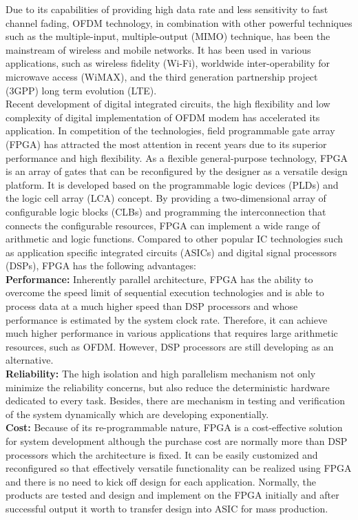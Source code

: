Due to its capabilities of providing high data rate and less sensitivity to fast channel fading, OFDM technology, in combination with other powerful techniques such as the multiple-input, multiple-output (MIMO) technique, has been the mainstream of wireless and mobile networks. It has been used in various applications, such as wireless fidelity (Wi-Fi), worldwide inter-operability for microwave access (WiMAX), and the third generation partnership project (3GPP) long term evolution (LTE).\\

Recent development of digital integrated circuits, the high flexibility and low complexity of digital implementation of OFDM modem has accelerated its application. In competition of the technologies, field programmable gate array (FPGA) has attracted the most attention in recent years due to its superior performance and high flexibility. As a flexible general-purpose technology, FPGA is an array of gates that can be reconfigured by the designer as a versatile design platform. It is developed based on the programmable logic devices (PLDs) and the logic cell array (LCA) concept. By providing a two-dimensional array of configurable logic blocks (CLBs) and programming the interconnection that connects the configurable resources, FPGA can implement a wide range of arithmetic and logic functions. Compared to other popular IC technologies such as application specific integrated circuits (ASICs) and digital signal processors (DSPs), FPGA has the following advantages:\\

\textbf{Performance:} Inherently parallel architecture, FPGA has the ability to overcome the speed limit of sequential execution technologies and is able to process data at a much higher speed than DSP processors and whose performance is estimated by the system clock rate. Therefore, it can achieve much higher performance in various applications that requires large arithmetic resources, such as OFDM. However, DSP processors are still developing as an alternative.\\

\textbf{Reliability:} The high isolation and high parallelism mechanism not only minimize the reliability concerns, but also reduce the deterministic hardware dedicated to every task. Besides, there are mechanism in testing and verification of the system dynamically which are developing exponentially.\\

\textbf{Cost:} Because of its re-programmable nature, FPGA is a cost-effective solution for system development although the purchase cost are normally more than DSP processors which the architecture is fixed. It can be easily customized and reconfigured so that effectively versatile functionality can be realized using FPGA and there is no need to kick off design for each application. Normally, the products are tested and design and implement on the FPGA initially and after successful output it worth to transfer design into ASIC for mass production.\\

